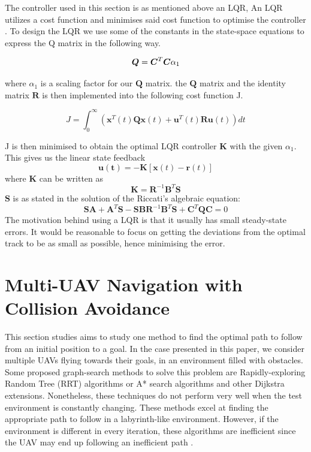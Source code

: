 \documentclass[journal]{IEEEtran}
\begin{document}
	The controller used in this section is as mentioned above an LQR,  An LQR utilizes a cost function and minimises said cost function to optimise the controller \cite{bokLQ}. To design the LQR we use some of the constants in the state-space equations to express the Q matrix in the following way.
	
	\begin{equation}
	\bm{Q}=\bm{C^}{T}\bm{C}\alpha_{1}
	\end{equation}
	
	where $\alpha_{1}$ is a scaling factor for our $\bm{Q}$ matrix.
	the $\bm{Q}$ matrix and the identity matrix $\bm{R}$ is then implemented into the following cost function J.
	
	\begin{equation}\label{eq:costfunctionJ}
	J = \int_{0}^{\infty} (\bm{x}^{T}(t)\bm{Q}\bm{x}(t)+\bm{u}^{T}(t)\bm{R}\bm{u}(t)) dt
	\end{equation}
	
	J is then minimised to obtain the optimal LQR controller $\bm{K}$ with the given $\alpha_{1}$. This gives us the	linear state  feedback
	\begin{equation}\label{eq:linearstatefeedback}
	\bm{u(t)} = -\bm{K}[\bm{x}(t)-\bm{r}(t)]
\end{equation}
	where $\bm{K}$ can be written as		
	\begin{equation}\label{eq:linearstatefeedback2}
		\bm{K} = \bm{R}^{-1}\bm{B}^T\bm{S}
	\end{equation}
		$\bm{S}$ is as stated in \cite{mod_control_bresciani} the solution of the Riccati's algebraic equation: 
	\begin{equation}\label{eq:linearstatefeedback3}
		\bm{S}\bm{A} + \bm{A}^T\bm{S} - \bm{S}\bm{B}\bm{R}^{-1}\bm{B}^T\bm{S} + \bm{C}^T\bm{Q}\bm{C} = 0
	\end{equation}	
	 The motivation behind using a LQR is that it usually has small steady-state errors\cite{lqr_error}. It would be reasonable to focus on getting the deviations from the optimal track to be as small as possible, hence minimising the error.   
	
		
	\section{Multi-UAV Navigation with Collision Avoidance}\label{navigation}
		This section studies aims to study one method to find the optimal path to follow from an initial position to a goal. In the case presented in this paper, we consider multiple UAVs flying towards their goals, in an environment filled with obstacles. Some proposed graph-search methods to solve this problem are Rapidly-exploring Random Tree (RRT) algorithms or A* search algorithms and other Dijkstra extensions.	Nonetheless, these techniques do not perform very well when the test environment is constantly changing. These methods excel at finding the appropriate path to follow in a labyrinth-like environment. However, if the environment is different in every iteration, these algorithms are inefficient since the UAV may end up following an inefficient path \cite{lavalle_rrt, lavalle_astar}.\\
		
\end{document}
